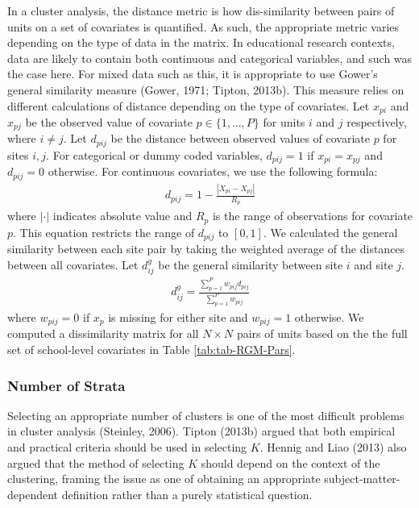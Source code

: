 \documentclass[
  english,
  man,floatsintext]{apa6}
\begin{document}
In a cluster analysis, the distance metric is how dis-similarity between pairs of units on a set of covariates is quantified. As such, the appropriate metric varies depending on the type of data in the matrix.
In educational research contexts, data are likely to contain both continuous and categorical variables, and such was the case here. For mixed data such as this, it is appropriate to use Gower's general similarity measure (Gower, 1971; Tipton, 2013b). This measure relies on different calculations of distance depending on the type of covariates. Let \(x_{pi}\) and \(x_{pj}\) be the observed value of covariate \(p \in \{1, ..., P\}\) for units \(i\) and \(j\) respectively, where \(i \ne j\). Let \(d_{pij}\) be the distance between observed values of covariate \(p\) for sites \(i,j\). For categorical or dummy coded variables, \(d_{pij} = 1\) if \(x_{pi} = x_{pj}\) and \(d_{pij} = 0\) otherwise. For continuous covariates, we use the following formula:
\begin{align}
\label{eq:gowerdist-p}
d_{pij} = 1 - \frac{|X_{pi} - X_{pj}|}{R_p}
\end{align}
where \(|\cdot|\) indicates absolute value and \(R_p\) is the range of observations for covariate \(p\). This equation restricts the range of \(d_{pij}\) to \([0,1]\). We calculated the general similarity between each site pair by taking the weighted average of the distances between all covariates. Let \(d^{g}_{ij}\) be the general similarity between site \(i\) and site \(j\).
\begin{align}
\label{eq:gowerdist}
d^{g}_{ij} = \frac{\sum^P_{p = 1} w_{pij} d_{pij}}{\sum^P_{p = 1} w_{pij}}
\end{align}
where \(w_{pij} = 0\) if \(x_p\) is missing for either site and \(w_{pij} = 1\) otherwise.
We computed a dissimilarity matrix for all \(N \times N\) pairs of units based on the the full set of school-level covariates in Table \ref{tab:tab-RGM-Pars}.

\hypertarget{number-of-strata}{%
\subsubsection{Number of Strata}\label{number-of-strata}}

Selecting an appropriate number of clusters is one of the most difficult problems in cluster analysis (Steinley, 2006). Tipton (2013b) argued that both empirical and practical criteria should be used in selecting \(K\). Hennig and Liao (2013) also argued that the method of selecting \(K\) should depend on the context of the clustering, framing the issue as one of obtaining an appropriate subject-matter-dependent definition rather than a purely statistical question.
\end{document}
